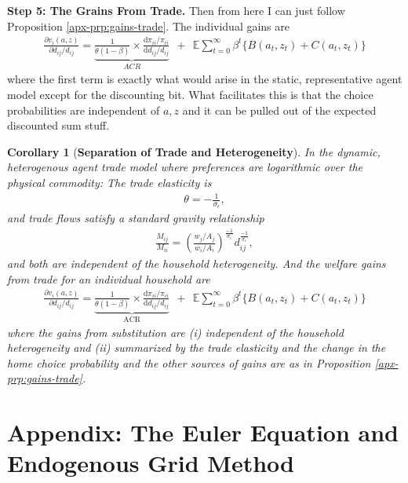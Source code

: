 \documentclass[12pt,pdftex]{article}
\newtheorem{corr}{Corollary}
\begin{document}
\begin{onehalfspacing}
\textbf{Step 5: The Grains From Trade.} Then from here I can just follow Proposition \ref{apx-prp:gains-trade}. The individual gains are
{\footnotesize
\begin{align}
\nonumber
\frac{\partial v_i(a, z)}{\partial d_{ij} / d_{ij}} = \underbrace{\frac{1}{\theta (1-\beta)} \times \frac{\mathrm{d} \pi_{ii} / \pi_{ii}}{\mathrm{d}d_{ij} / d_{ij}}}_{ACR} \ \ + \ \
\mathbb{E} \sum_{t = 0}^{\infty} \beta^{t} \bigg \{ B(a_{t},z_{t}) + C(a_{t},z_{t}) \bigg \}
\end{align}
}where the first term is exactly what would arise in the static, representative agent model except for the discounting bit. What facilitates this is that the choice probabilities are independent of $a,z$ and it can be pulled out of the expected discounted sum stuff.

\begin{corr}[\textbf{Separation of Trade and Heterogeneity}] In the dynamic, heterogenous agent trade model where preferences are logarithmic over the physical commodity: The trade elasticity is
\begin{align}
\theta = -\frac{1}{\sigma_{\epsilon}}, \nonumber
\end{align}
and trade flows satisfy a standard gravity relationship
\begin{align}
\frac{M_{ij}}{M_{ii}} = \left( \frac{  w_{j} / A_{j} }{  w_{i} / A_{i} } \right)^{\frac{-1}{\sigma_{\epsilon}}} d_{ij}^{\frac{-1}{\sigma_{\epsilon}}}, \nonumber
\end{align}
and both are independent of the household heterogeneity. And the welfare gains from trade for an individual household are
\begin{align}
\nonumber
\frac{\partial v_i(a, z)}{\partial d_{ij} / d_{ij}} = \underbrace{\frac{1}{\theta (1-\beta)} \times \frac{\mathrm{d} \pi_{ii} / \pi_{ii}}{\mathrm{d}d_{ij} / d_{ij}}}_{\mbox{ACR}} \ \ + \ \
\mathbb{E} \sum_{t = 0}^{\infty} \beta^{t} \bigg \{ B(a_{t},z_{t}) + C(a_{t},z_{t}) \bigg \}
\end{align}
where the gains from substitution are (i) independent of the household heterogeneity and (ii) summarized by the trade elasticity and the change in the home choice probability and the other sources of gains are as in Proposition \ref{apx-prp:gains-trade}.
\end{corr}

\section{Appendix: The Euler Equation and Endogenous Grid Method}


\end{onehalfspacing}
\end{document}

